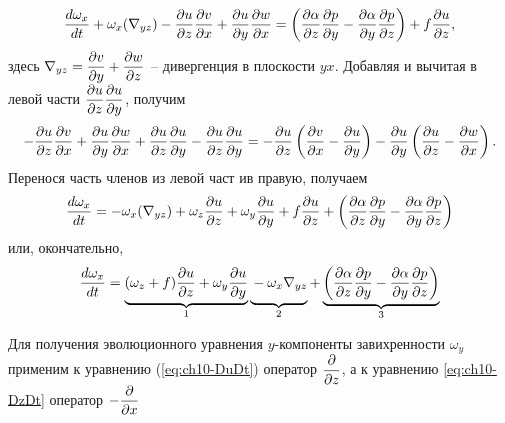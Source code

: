 \begin{equation*}
    \td{\omega_x}{t}+\omega_x(\nabla_{yz})-\pd{u}{z}\pd{v}{x}+\pd{u}{y}\pd{w}{x} = \left( \pd{\alpha}{z}\pd{p}{y} - \pd{\alpha}{y}\pd{p}{z} \right) + f\pd{u}{z},
\end{equation*}
здесь $\nabla_{yz} = \pd{v}{y} +\pd{w}{z}$ -- дивергенция в плоскости $yx$. 
Добавляя и вычитая в левой части $\pd{u}{z}\pd{u}{y}$, получим
\begin{equation*}
    -\pd{u}{z}\pd{v}{x}+\pd{u}{y}\pd{w}{x}+\pd{u}{z}\pd{u}{y}-\pd{u}{z}\pd{u}{y} = -\pd{u}{z} \left( \pd{v}{x}-\pd{u}{y} \right) - \pd{u}{y} \left( \pd{u}{z} - \pd{w}{x} \right).
\end{equation*}
Перенося часть членов из левой част ив правую, получаем
\begin{equation*}
    \td{\omega_x}{t} = -\omega_x(\nabla_{yz}) + \omega_z\pd{u}{z}+\omega_y\pd{u}{y}+f\pd{u}{z}+ \left( \pd{\alpha}{z}\pd{p}{y} - \pd{\alpha}{y}\pd{p}{z} \right)
\end{equation*}
или, окончательно,
\begin{equation}
\label{eq:ch10_omegax}
    \td{\omega_x}{t}=
    \underbrace{(\omega_z+f)\pd{u}{z} + \omega_y\pd{u}{y}}_{1}
    \underbrace{\vphantom{(\omega_z+f)\pd{u}{z} + \omega_y\pd{u}{y}}-\omega_x\nabla_{yz}}_{2}+
    \underbrace{\left( \pd{\alpha}{z}\pd{p}{y} - \pd{\alpha}{y}\pd{p}{z} \right)}_{3}
\end{equation}

Для получения эволюционного уравнения $y$-компоненты завихренности $\omega_y$ применим к уравнению (\ref{eq:ch10-DuDt}) оператор $\pd{}{z}$, а к уравнению \ref{eq:ch10-DzDt} оператор $-\pd{}{x}$

